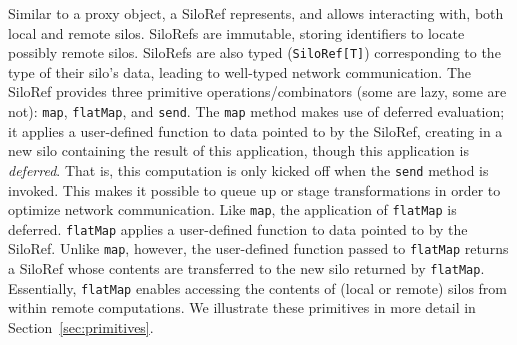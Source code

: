 \documentclass[preprint]{sigplanconf}
\theoremstyle{definition}
\theoremstyle{definition}
\begin{document}
Similar to a proxy object, a SiloRef  
represents, and allows interacting with, both local and remote silos. SiloRefs 
are immutable, storing identifiers to locate possibly remote silos. SiloRefs 
are also typed (\verb|SiloRef[T]|) corresponding to the type of their silo's 
data, leading to well-typed network communication. The SiloRef provides three 
primitive operations/combinators (some are lazy, some are not): \verb|map|, 
\verb|flatMap|, and \verb|send|. The \verb|map| method makes use of deferred 
evaluation; it  applies a 
user-defined function to data pointed to by the SiloRef, creating in a new silo 
containing the result of this application, though this application is 
\textit{deferred}. That is, this computation is only kicked off when the 
\verb|send| method is invoked. This makes it possible to queue up or stage 
transformations in order to optimize network communication. Like \verb|map|, the 
application of \verb|flatMap| is deferred. \verb|flatMap|  applies a 
user-defined function to data pointed to by the SiloRef. Unlike \verb|map|, 
however, the user-defined function passed to \verb|flatMap| returns a SiloRef 
whose contents are  transferred to the new silo returned by 
\verb|flatMap|. Essentially, \verb|flatMap| enables accessing the contents of 
(local or remote) silos from within remote computations. We illustrate these 
primitives in more detail in Section~\ref{sec:primitives}.

\end{document}
